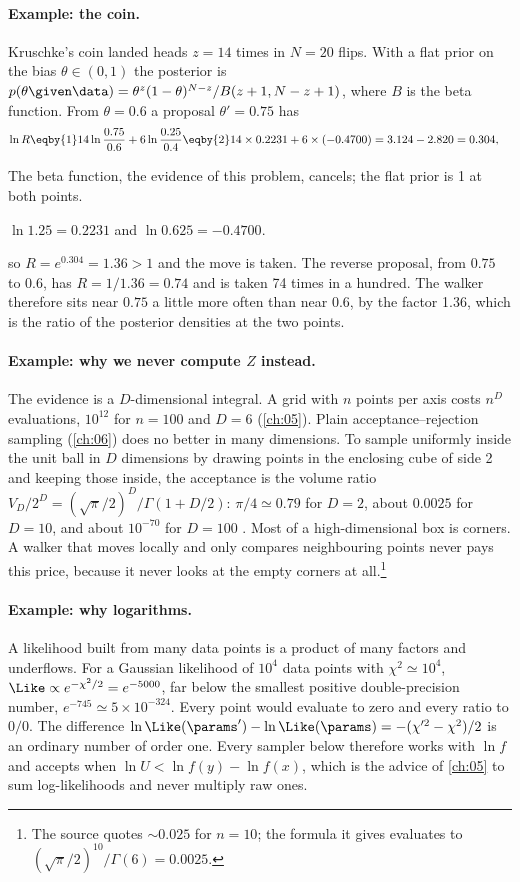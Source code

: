 \paragraph{Example: the coin.}
Kruschke's coin  landed heads $z=14$ times in $N=20$ flips. With a flat
prior on the bias $\theta\in(0,1)$ the posterior is
$p(\theta\given\data)=\theta^{z}(1-\theta)^{N-z}/B(z+1,N-z+1)$, where $B$ is the beta function.
From $\theta=0.6$ a proposal $\theta'=0.75$ has
\begin{align*}
  \ln R
  &\eqby{1}14\ln\frac{0.75}{0.6}+6\ln\frac{0.25}{0.4}
   \eqby{2}14\times0.2231+6\times(-0.4700)
   =3.124-2.820=0.304 ,
\end{align*}
\begin{explain}
  \item The beta function, the evidence of this problem, cancels; the flat prior is 1 at both
        points.
  \item $\ln1.25=0.2231$ and $\ln0.625=-0.4700$.
\end{explain}
so $R=e^{0.304}=1.36>1$ and the move is taken. The reverse proposal, from $0.75$ to $0.6$,
has $R=1/1.36=0.74$ and is taken 74 times in a hundred. The walker therefore sits near $0.75$ a
little more often than near $0.6$, by the factor 1.36, which is the ratio of the posterior
densities at the two points.

\paragraph{Example: why we never compute $Z$ instead.}
The evidence is a $D$-dimensional integral. A grid with $n$ points per axis costs $n^D$
evaluations, $10^{12}$ for $n=100$ and $D=6$ (\cref{ch:05}). Plain acceptance--rejection
sampling (\cref{ch:06}) does no better in many dimensions. To sample uniformly inside the unit
ball in $D$ dimensions by drawing points in the enclosing cube of side 2 and keeping those
inside, the acceptance is the volume ratio
$V_D/2^D=(\sqrt\pi/2)^D/\Gamma(1+D/2)$: $\pi/4\simeq0.79$ for $D=2$, about $0.0025$ for
$D=10$, and about $10^{-70}$ for $D=100$ . Most of a
high-dimensional box is corners. A walker that moves locally and only compares neighbouring
points never pays this price, because it never looks at the empty corners at all.\footnote{The
source quotes $\sim0.025$ for $n=10$; the formula it gives evaluates to
$(\sqrt\pi/2)^{10}/\Gamma(6)=0.0025$.}

\paragraph{Example: why logarithms.}
A likelihood built from many data points is a product of many factors and underflows. For a
Gaussian likelihood of $10^4$ data points with $\chi^2\simeq10^4$, $\Like\propto
e^{-\chi^2/2}=e^{-5000}$, far below the smallest positive double-precision number,
$e^{-745}\simeq5\times10^{-324}$. Every point would evaluate to zero and every ratio to $0/0$.
The difference $\ln\Like(\params')-\ln\Like(\params)=-(\chi^{\prime2}-\chi^2)/2$ is an
ordinary number of order one. Every sampler below therefore works with $\ln f$ and
accepts when $\ln U<\ln f(y)-\ln f(x)$, which is the advice of \cref{ch:05} to sum
log-likelihoods and never multiply raw ones.
